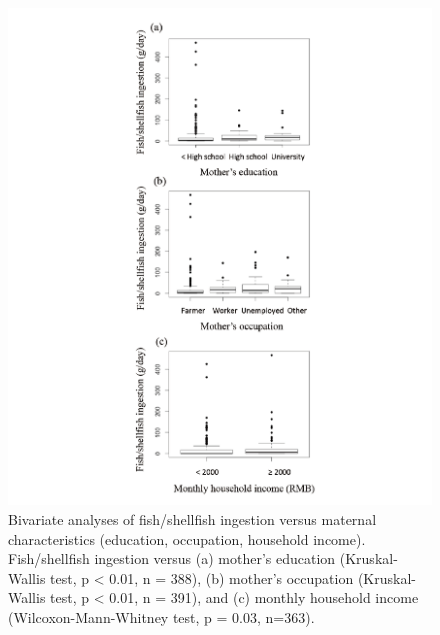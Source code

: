 \begin{figure}
  \centering
    \label{fig:Fig311}
  \includegraphics[scale=1]{Figures/Fig311.pdf}
  \caption[Bivariate analyses of fish/shellfish ingestion versus maternal characteristics (education, occupation, household income)]{Bivariate analyses of fish/shellfish ingestion versus maternal characteristics (education, occupation, household income). Fish/shellfish ingestion versus (a) mother's education (Kruskal-Wallis test, p < 0.01, n = 388), (b) mother's occupation (Kruskal-Wallis test, p < 0.01, n = 391), and (c) monthly household income (Wilcoxon-Mann-Whitney test, p = 0.03, n=363).}
\end{figure}

